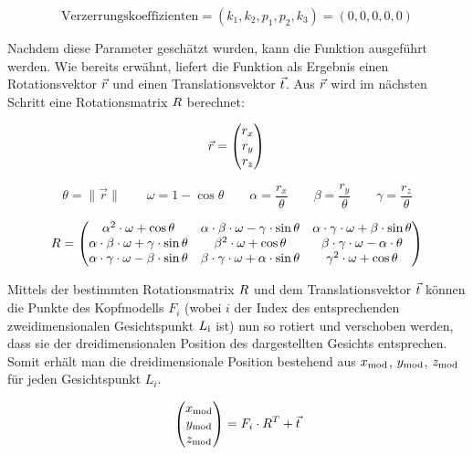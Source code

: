 \[
\text{Verzerrungskoeffizienten} = (k_1, k_2, p_1, p_2, k_3) = (0, 0, 0, 0, 0)
\]

Nachdem diese Parameter geschätzt wurden, kann die Funktion ausgeführt werden.
Wie bereits erwähnt, liefert die Funktion als Ergebnis einen Rotationsvektor $\vec{r}$ und einen Translationsvektor $\vec{t}$. Aus $\vec{r}$ wird im nächsten Schritt eine Rotationsmatrix $R$ berechnet:

\[
\vec{r} = \begin{pmatrix}
    r_x \\ r_y \\ r_z
\end{pmatrix} \\
\]

\[
\theta = \|\vec{r}\| \qquad
\omega =  1- \cos \theta \qquad
\alpha = \frac{r_x}{\theta} \qquad
\beta = \frac{r_y}{\theta} \qquad
\gamma = \frac{r_z}{\theta}
\]

\[
R = \begin{pmatrix}
    \alpha^2\cdot\omega + \cos \theta & \alpha\cdot\beta\cdot\omega - \gamma \cdot\sin\theta & \alpha\cdot\gamma\cdot\omega + \beta\cdot\sin\theta \\
    \alpha\cdot\beta\cdot\omega + \gamma \cdot \sin \theta & \beta^2 \cdot\omega+\cos\theta & \beta\cdot\gamma\cdot\omega-\alpha\cdot\theta \\
    \alpha\cdot\gamma\cdot\omega - \beta \cdot \sin\theta & \beta\cdot\gamma\cdot\omega + \alpha\cdot\sin\theta & \gamma^2\cdot\omega+\cos\theta \\
\end{pmatrix}
\]

Mittels der bestimmten Rotationsmatrix $R$ und dem Translationsvektor $\vec{t}$  können die Punkte des Kopfmodells $F_i$ (wobei $i$ der Index des entsprechenden zweidimensionalen Gesichtspunkt $L_{\text{i}}$ ist) nun so rotiert und verschoben werden, dass sie der dreidimensionalen Position des dargestellten Gesichts entsprechen. Somit erhält man die dreidimensionale Position bestehend aus $x_{\text{mod}}$, $y_{\text{mod}}$, $z_{\text{mod}}$ für jeden Gesichtspunkt $L_i$.

\[
\begin{pmatrix}
   x_{\text{mod}} \\ y_{\text{mod}} \\ z_{\text{mod}} \\ 
\end{pmatrix} = F_i \cdot R^T + \vec{t}
\]

